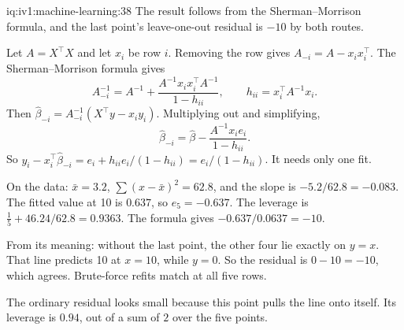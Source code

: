 \begin{solution}{iq:iv1:machine-learning:38}
The result follows from the Sherman--Morrison formula, and the last point's leave-one-out residual is $-10$ by both routes.

Let $A = X^\top X$ and let $x_i$ be row $i$. Removing the row gives $A_{-i} = A - x_ix_i^\top$. The Sherman--Morrison formula gives
\[
A_{-i}^{-1} = A^{-1} + \frac{A^{-1}x_ix_i^\top A^{-1}}{1 - h_{ii}}, \qquad h_{ii} = x_i^\top A^{-1}x_i.
\]
Then $\hat{\beta}_{-i} = A_{-i}^{-1}(X^\top y - x_iy_i)$. Multiplying out and simplifying,
\[
\hat{\beta}_{-i} = \hat{\beta} - \frac{A^{-1}x_ie_i}{1 - h_{ii}}.
\]
So $y_i - x_i^\top\hat{\beta}_{-i} = e_i + h_{ii}e_i/(1 - h_{ii}) = e_i/(1 - h_{ii})$. It needs only one fit.

On the data: $\bar{x} = 3.2$, $\sum(x - \bar{x})^2 = 62.8$, and the slope is $-5.2/62.8 = -0.083$. The fitted value at 10 is $0.637$, so $e_5 = -0.637$. The leverage is $\frac15 + 46.24/62.8 = 0.9363$. The formula gives $-0.637/0.0637 = -10$.

From its meaning: without the last point, the other four lie exactly on $y = x$. That line predicts 10 at $x = 10$, while $y = 0$. So the residual is $0 - 10 = -10$, which agrees. Brute-force refits match at all five rows.

The ordinary residual looks small because this point pulls the line onto itself. Its leverage is $0.94$, out of a sum of $2$ over the five points.



\end{solution}

